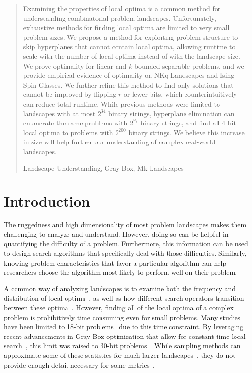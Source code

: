 \documentclass[runningheads,a4paper]{llncs}
\newcommand{\keywords}[1]{\par\addvspace\baselineskip
\noindent\keywordname\enspace\ignorespaces#1}
\begin{document}
\begin{abstract}
Examining the properties of local optima is a common method for understanding
combinatorial-problem landscapes.
Unfortunately,
exhaustive methods for finding local optima are limited to very small problem sizes.
We propose a method for exploiting problem structure
to skip hyperplanes
that cannot contain local optima, allowing runtime to scale with
the number of local optima instead of with the landscape size.
We prove optimality for linear and $k$-bounded separable problems, and we provide
empirical evidence of optimality on NKq Landscapes and Ising Spin Glasses.
We further refine this method to find only solutions
that cannot be improved by flipping $r$ or fewer bits, which counterintuitively
can reduce total runtime. While previous methods were limited to
landscapes with at most $2^{34}$ binary strings, hyperplane elimination can enumerate the same problems with
$2^{77}$ binary strings, and find all 4-bit local optima to problems with $2^{200}$ binary strings.
We believe this increase in size will help further our understanding of complex real-world landscapes.



\keywords{Landscape Understanding, Gray-Box, Mk Landscapes}
\end{abstract}


\section{Introduction}
The ruggedness and high dimensionality of most problem landscapes makes them challenging to
analyze and understand. However, doing so can be helpful in
quantifying the difficulty of a problem. Furthermore,
this information can be used to design search algorithms that specifically deal
with those difficulties. 
Similarly, knowing problem characteristics that favor
a particular
algorithm can help researchers choose the algorithm
most likely to perform well on their problem.

A common way of analyzing landscapes is to
examine both the frequency and distribution of local optima~\cite{boese:1994:bigvalley},
as well as how different search operators transition between these
optima~\cite{tomassini:2008:nknetworks,verel:2011:nknetworks,ochoa:2015:crossovernetworks}.
However, finding all of the local optima of a complex problem is prohibitively time consuming
even for small problems. Many studies have been limited to 18-bit
problems~\cite{tomassini:2008:nknetworks,verel:2011:nknetworks} due to this time constraint.
By leveraging recent advancements in Gray-Box optimization that allow for
constant time local search~\cite{chicano:2014:ball}, this limit was raised
to 30-bit problems~\cite{ochoa:2015:crossovernetworks}. While sampling
methods can approximate some of these statistics for much larger
landscapes~\cite{iclanzan:2014:somnetworks}, they do not provide enough
detail necessary for some metrics~\cite{ochoa:2015:crossovernetworks}.
\end{document}
